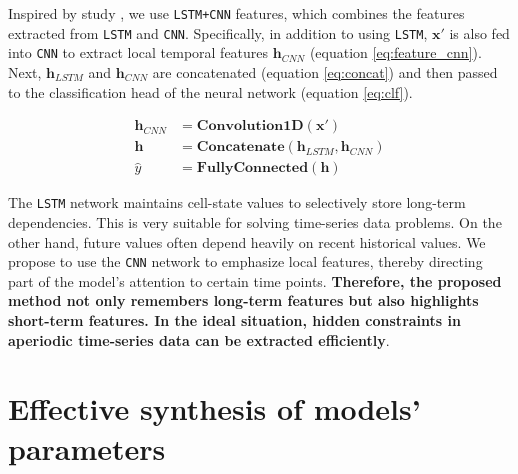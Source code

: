 Inspired by study \cite{vo2017multi}, we use \verb|LSTM+CNN| features, which combines the features extracted from \verb|LSTM| and \verb|CNN|. Specifically, in addition to using \verb|LSTM|, $\mathbf{x'}$ is also fed into \verb|CNN| to extract local temporal features $\mathbf{h}_{CNN}$ (equation \ref{eq:feature_cnn}). Next, $\mathbf{h}_{LSTM}$ and $\mathbf{h}_{CNN}$ are concatenated (equation \ref{eq:concat}) and then passed to the classification head of the neural network (equation \ref{eq:clf}).

\begin{align}
    \mathbf{h}_{CNN} &= \mathbf{Convolution1D}\left( \mathbf{x'} \right) \label{eq:feature_cnn}\\
    \mathbf{h} &= \mathbf{Concatenate}\left( \mathbf{h}_{LSTM}, \mathbf{h}_{CNN} \right) \label{eq:concat} \\
    \hat y &= \mathbf{FullyConnected}\left( \mathbf{h} \right) \label{eq:clf}
\end{align}


The \verb|LSTM| network maintains cell-state values to selectively store long-term dependencies. This is very suitable for solving time-series data problems. On the other hand, future values often depend heavily on recent historical values. We propose to use the \verb|CNN| network to emphasize local features, thereby directing part of the model's attention to certain time points. \textbf{Therefore, the proposed method not only remembers long-term features but also highlights short-term features. In the ideal situation, hidden constraints in aperiodic time-series data can be extracted efficiently}.


\section{Effective synthesis of models' parameters}

